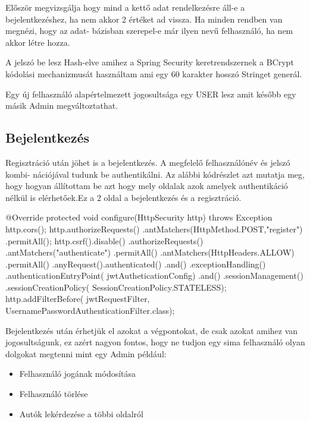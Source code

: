 Először megvizsgálja hogy mind a kettő adat rendelkezésre áll-e a bejelentkezéshez, ha nem akkor 2 értéket ad vissza. Ha minden rendben van megnézi, hogy az adat-
bázisban szerepel-e már ilyen nevű felhasználó, ha nem akkor létre hozza.


A jelszó be lesz Hash-elve amihez a Spring Security  keretrendszernek a BCrypt kódolási mechanizmusát használtam ami egy 60 karakter hosszó Stringet generál.

Egy új felhasználó alapértelmezett jogosultsága egy USER lesz amit később egy másik Admin megváltoztathat.

\subsection{Bejelentkezés}

Regisztráció után jöhet is a bejelentkezés. A megfelelő felhasználónév és jelszó kombi-
nációjával tudunk be authentikálni. Az alábbi kódrészlet azt mutatja meg, hogy hogyan állítottam be azt hogy mely oldalak azok amelyek authentikáció nélkül is elérhetőek.Ez a 2 oldal a bejelentkezés és a regisztráció.

\begin{java}
    @Override
    protected void configure(HttpSecurity http)
     throws Exception{
        http.cors();
        http.authorizeRequests()
        .antMatchers(HttpMethod.POST,"register")
        .permitAll();
        http.csrf().disable()
                .authorizeRequests()
                .antMatchers("authenticate")
                .permitAll()
                .antMatchers(HttpHeaders.ALLOW)
                .permitAll()
                .anyRequest().authenticated()
               .and()
               .exceptionHandling()
               .authenticationEntryPoint(
               jwtAutheticationConfig)
                .and()
                .sessionManagement()
                .sessionCreationPolicy(
                SessionCreationPolicy.STATELESS);
                http.addFilterBefore(
                jwtRequestFilter,
      UsernamePasswordAuthenticationFilter.class);
    }
\end{java}

Bejelentkezés után érhetjük el azokat a végpontokat, de csak azokat amihez van jogosultságunk, ez azért nagyon fontos, hogy ne tudjon egy sima felhasználó olyan dolgokat megtenni mint egy Admin például:

\begin{itemize}
\item Felhasználó jogának módosítása
\item Felhasználó törlése
\item Autók lekérdezése a többi oldalról
\end{itemize}

